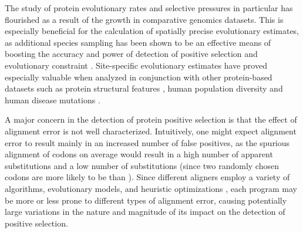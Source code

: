\documentclass{article}
\begin{document}
The study of protein evolutionary rates and selective pressures in
particular has flourished as a result of the growth in comparative
genomics datasets. This is especially beneficial for the calculation
of spatially precise evolutionary estimates, as additional species
sampling has been shown to be an effective means of boosting the
accuracy and power of \sw detection of positive selection and
evolutionary constraint
\citep{Anisimova2001Accuracy,Massingham2005Detecting}. Site-specific
evolutionary estimates have proved especially valuable when analyzed
in conjunction with other protein-based datasets such as protein
structural features \citep{Lin2007Proportion,Ramsey2011Relationship},
human population diversity \citep{2010Map} and human disease
mutations \citep{Arbiza2006Selective}.

A major concern in the detection of protein positive selection is that
the effect of alignment error is not well characterized. Intuitively,
one might expect alignment error to result mainly in an increased
number of false positives, as the spurious alignment of \nh codons on
average would result in a high number of apparent \nsyn substitutions
and a low number of \syn substitutions (since two randomly chosen
codons are more likely to be \nsyn than \syn).    Since different aligners employ a variety of
algorithms, evolutionary models, and heuristic optimizations
\citep{Notredame2007Recent}, each program may be more or less prone to
different types of alignment error, causing potentially large
variations in the nature and magnitude of its impact on the detection
of positive selection. 
\end{document}
